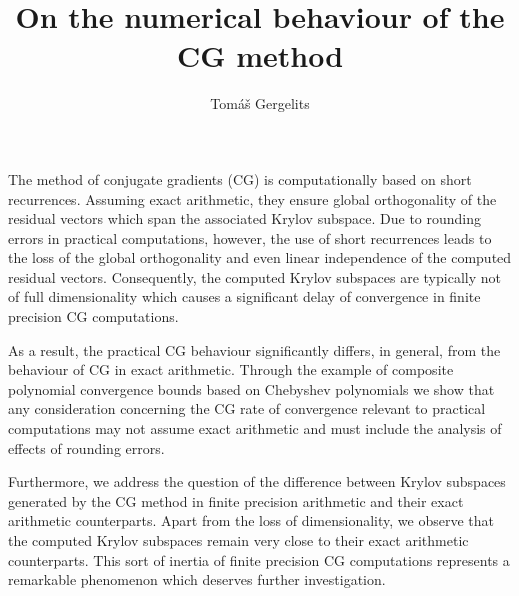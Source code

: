 \documentclass{article}
\title{On the numerical behaviour of the CG method}
\author{Tom{\'a}{\v s} Gergelits}
\affil{PhD student at Faculty of Mathematics and Physics, Charles University in Prague}
\date{}
\begin{document}
\maketitle
\setcounter{page}{11}
The method of conjugate gradients (CG) is computationally based on short recurrences. Assuming exact arithmetic, they ensure global orthogonality of the residual vectors which span the associated Krylov subspace. Due to rounding errors in practical computations, however, the use of short recurrences leads to the loss of the global orthogonality and even linear independence of the computed residual vectors. Consequently, the computed Krylov subspaces are typically not of full dimensionality which causes a significant delay of convergence in finite precision CG computations.

As a result, the practical CG behaviour significantly differs, in general, from the behaviour of CG in exact arithmetic. Through the example of composite polynomial convergence bounds based on Chebyshev polynomials we show that any consideration concerning the CG rate of convergence relevant to practical computations may not assume exact arithmetic and must include the analysis of effects of rounding errors.

Furthermore, we address the question of the difference between Krylov subspaces generated by the CG method in finite precision arithmetic and their exact arithmetic counterparts. Apart from the loss of dimensionality, we observe that  the computed Krylov subspaces remain very close to their exact arithmetic counterparts. This sort of inertia of finite precision CG computations represents a remarkable phenomenon which deserves further investigation.
\end{document}
